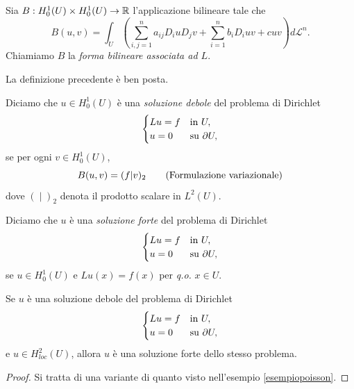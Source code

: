 \begin{definizione}
	Sia $B: H^1_0(U)\times H^1_0(U)\to \mathbb{R}$ l'applicazione bilineare tale che
	\[ B(u,v) = \int_U \left( \sum_{i,j=1}^{n}a_{ij}D_iuD_{j}v + \sum_{i=1}^{n}b_i D_iuv + cuv\right) d\mathcal{L}^n. \]
	Chiamiamo $B$ la \emph{forma bilineare associata ad $L$}.
\end{definizione}
La definizione precedente è ben posta.
\begin{definizione}
	Diciamo che $u \in H^1_0(U)$ è una \emph{soluzione debole} del problema di Dirichlet
	\begin{equation}
		\begin{cases}
			Lu = f & \textup{in } U,\\
			u = 0 & \textup{su } \partial U,
		\end{cases}
	\end{equation}
	se per ogni $v \in H^1_0(U)$, 
	\[ 	 B(u,v) = (f|v)_{2} \qquad \textup{(Formulazione variazionale)} \]
	dove $(\;|\;)_2$ denota il prodotto scalare in $L^2(U)$.
\end{definizione}
\begin{definizione}
	Diciamo che $u$ è una \emph{soluzione forte} del problema di Dirichlet
	\begin{equation}
		\begin{cases}
			Lu = f & \textup{in } U,\\
			u = 0 & \textup{su } \partial U,
		\end{cases}
	\end{equation}
	se $u \in H^{1}_0(U)$ e $L u(x) = f(x)$ per \emph{q.o.} $x \in U$.
\end{definizione}
\begin{proposizione}
	Se $u$ è una soluzione debole del problema di Dirichlet
	\begin{equation}
		\begin{cases}
			Lu = f & \textup{in } U,\\
			u = 0 & \textup{su } \partial U,
		\end{cases}
	\end{equation}
	e $u \in H^2_{loc}(U)$, allora $u$ è una soluzione forte dello stesso problema.	
\end{proposizione}
\begin{proof}
	Si tratta di una variante di quanto visto nell'esempio \eqref{esempiopoisson}.
\end{proof}
